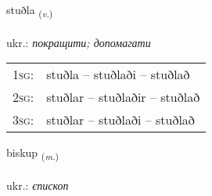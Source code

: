 \documentclass[frontgrid, backgrid]{flacards}\usepackage[]{graphicx}\usepackage[]{xcolor}
\begin{document}
\renewcommand{\flhead}{\vskip5pt \fboxsep=0pt {\small\bfseries\footnotesize Sagnorð | дієслово}}
\renewcommand{\fcfoot}{\vskip5pt \fboxsep=0pt \hspace{2pt}{\small\bfseries\footnotesize 1K}}

\renewcommand{\blhead}{\vskip5pt {\small\bfseries\footnotesize Sagnorð | дієслово }}
\renewcommand{\bcfoot}{\vskip5pt \hspace{2pt}{\small\bfseries\footnotesize 1K}}


{stuðla \small{\textsubscript{(\textit{v.})}} \\[1ex] %
\textphonetic{[stʏðla]} \\
ukr.: \emph{покращити; допомагати} \\  [2ex]
\renewcommand*{\arraystretch}{0.8}
\begin{tabular}{p{1cm}l}
\textsc{1sg}: & stuðla -- stuðlaði -- stuðlað \\ 
\textsc{2sg}: & stuðlar -- stuðlaðir -- stuðlað \\ 
\textsc{3sg}: & stuðlar -- stuðlaði -- stuðlað \\ 
\end{tabular}
}

\renewcommand{\flhead}{\vskip5pt \fboxsep=0pt {\small\bfseries\footnotesize Nafnorð | іменник}}
\renewcommand{\fcfoot}{\vskip5pt \fboxsep=0pt \hspace{2pt}{\small\bfseries\footnotesize 1K}}

\renewcommand{\blhead}{\vskip5pt {\small\bfseries\footnotesize Nafnorð | іменник }}
\renewcommand{\bcfoot}{\vskip5pt \hspace{2pt}{\small\bfseries\footnotesize 1K}}


{biskup \small{\textsubscript{(\textit{m.})}} \\[1ex] %
\textphonetic{[pɪskʏp]} \\
ukr.: \emph{єпископ} \\  [2ex]
\renewcommand*{\arraystretch}{0.8}
}
\end{document}
